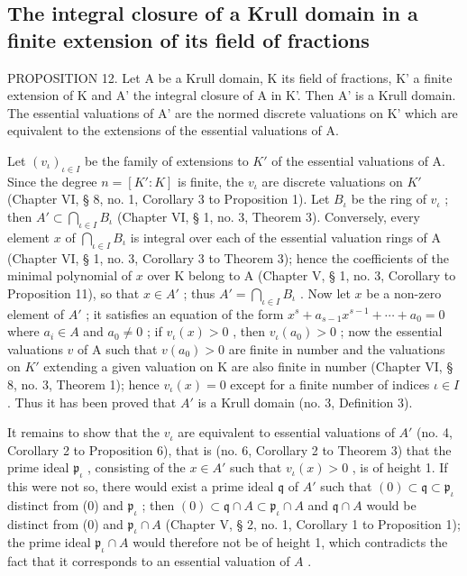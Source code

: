 \subsection{The integral closure of a Krull domain in a finite extension of its field of fractions}

PROPOSITION 12. Let A be a Krull domain, K its field of fractions, K' a finite extension of K and A' the integral closure of A in K'. Then A' is a Krull domain. The essential valuations of A' are the normed discrete valuations on K' which are equivalent to the extensions of the essential valuations of A.

Let \((v_{\iota})_{\iota\in I}\) be the family of extensions to \(K'\) of the essential valuations of A. Since the degree \(n = [K':K]\) is finite, the \(v_{\iota}\) are discrete valuations on \(K'\) (Chapter VI, § 8, no. 1, Corollary 3 to Proposition 1). Let \(B_{\iota}\) be the ring of \(v_{\iota}\) ; then \(A' \subset \bigcap_{\iota\in I}B_{\iota}\) (Chapter VI, § 1, no. 3, Theorem 3). Conversely, every element \(x\) of \(\bigcap_{\iota\in I}B_{\iota}\) is integral over each of the essential valuation rings of A (Chapter VI, § 1, no. 3, Corollary 3 to Theorem 3); hence the coefficients of the minimal polynomial of \(x\) over K belong to A (Chapter V, § 1, no. 3, Corollary to Proposition 11), so that \(x\in A'\) ; thus \(A' = \bigcap_{\iota\in I}B_{\iota}\) . Now let \(x\) be a non-zero element of \(A'\) ; it satisfies an equation of the form \(x^{s} + a_{s-1}x^{s-1} + \cdots + a_{0} = 0\) where \(a_{i}\in A\) and \(a_{0}\neq 0\) ; if \(v_{\iota}(x) > 0\) , then \(v_{\iota}(a_{0}) > 0\) ; now the essential valuations \(v\) of A such that \(v(a_{0}) > 0\) are finite in number and the valuations on \(K'\) extending a given valuation on K are also finite in number (Chapter VI, § 8, no. 3, Theorem 1); hence \(v_{\iota}(x) = 0\) except for a finite number of indices \(\iota\in I\) . Thus it has been proved that \(A'\) is a Krull domain (no. 3, Definition 3).

It remains to show that the \(v_{\iota}\) are equivalent to essential valuations of \(A'\) (no. 4, Corollary 2 to Proposition 6), that is (no. 6, Corollary 2 to Theorem 3) that the prime ideal \(\mathfrak{p}_{\iota}\) , consisting of the \(x \in A'\) such that \(v_{\iota}(x) > 0\) , is of height 1. If this were not so, there would exist a prime ideal \(\mathfrak{q}\) of \(A'\) such that \((0) \subset \mathfrak{q} \subset \mathfrak{p}_{\iota}\) distinct from (0) and \(\mathfrak{p}_{\iota}\) ; then \((0) \subset \mathfrak{q} \cap A \subset \mathfrak{p}_{\iota} \cap A\) and \(\mathfrak{q} \cap A\) would be distinct from (0) and \(\mathfrak{p}_{\iota} \cap A\) (Chapter V, § 2, no. 1, Corollary 1 to Proposition 1); the prime ideal \(\mathfrak{p}_{\iota} \cap A\) would therefore not be of height 1, which contradicts the fact that it corresponds to an essential valuation of \(A\) .

